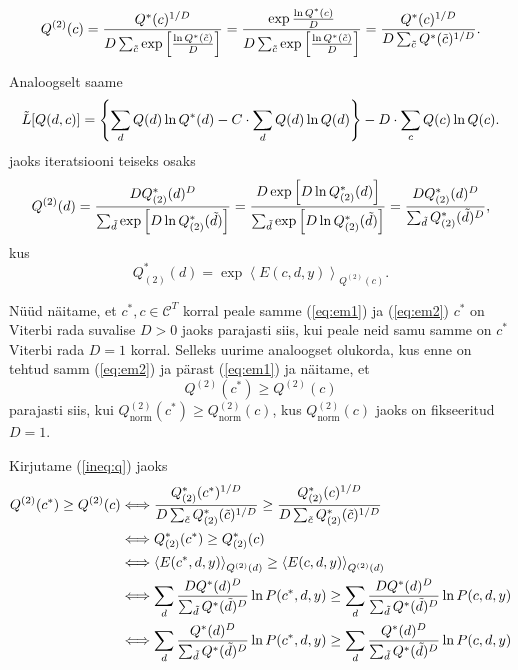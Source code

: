 \begin{equation}
    \label{eq:em1}
    Q^{(2)}(c) = \frac{Q^*(c)^{1/D}}{D \sum_{\Tilde{c}} \exp \left[\frac{\ln Q^*(\Tilde{c})}{D}\right]}= \frac{\exp \frac{\ln Q^*(c)}{D}}{D \sum_{\Tilde{c}} \exp \left[\frac{\ln Q^*(\Tilde{c})}{D}\right]} = \frac{Q^*(c)^{1/D}}{D \sum_{\Tilde{c}} Q^*(\Tilde{c})^{1/D}}.
\end{equation}

Analoogselt saame
$$
\Tilde{L}[Q(d, c)]= \left\{ \sum_{d} Q(d) \ln Q^*(d) - C \cdot \sum_{d} Q(d) \ln Q(d) \right\} -  D \cdot \sum_{c} Q(c) \ln Q(c) .
$$
jaoks iteratsiooni teiseks osaks
\begin{equation}
    \label{eq:em2}
    Q^{(2)}(d) = \frac{D Q^{*}_{(2)}(d)^{D}}{ \sum_{\Tilde{d}} \exp \left[D \ln Q^{*}_{(2)}(\Tilde{d})\right]}= \frac{D \exp \left[ D \ln Q^{*}_{(2)}(d) \right]}{ \sum_{\Tilde{d}} \exp \left[D \ln Q^{*}_{(2)}(\Tilde{d})\right]} = \frac{D Q^{*}_{(2)}(d)^D}{\sum_{\Tilde{d}} Q^{*}_{(2)}(\Tilde{d})^D},
\end{equation}
kus
$$Q^{*}_{(2)}(d) = \exp \left< E(c, d, y) \right>_{Q^{(2)}(c)}.$$

Nüüd näitame, et $c^*, c \in \mathcal{C}^T$ korral peale samme (\ref{eq:em1}) ja (\ref{eq:em2}) $c^*$ on Viterbi rada suvalise $D > 0$ jaoks parajasti siis, kui peale neid samu samme on $c^*$ Viterbi rada $D = 1$ korral. Selleks uurime analoogset olukorda, kus enne on tehtud samm (\ref{eq:em2}) ja pärast (\ref{eq:em1}) ja näitame, et 
\begin{equation}
    \label{ineq:q}
     Q^{(2)}(c^*) \ge Q^{(2)}(c)
\end{equation} parajasti siis, kui $Q^{(2)}_{\text{norm}}(c^*) \ge Q^{(2)}_{\text{norm}}(c)$, kus $Q^{(2)}_{\text{norm}}(c)$ jaoks on fikseeritud $D=1$.

Kirjutame (\ref{ineq:q}) jaoks
\begin{align*}
    Q^{(2)}(c^*) \ge Q^{(2)}(c) &\Longleftrightarrow \frac{Q^{*}_{(2)}(c^*)^{1/D}}{D \sum_{\Tilde{c}} Q^{*}_{(2)}(\Tilde{c})^{1/D}} \ge \frac{Q^{*}_{(2)}(c)^{1/D}}{D \sum_{\Tilde{c}} Q^{*}_{(2)}(\Tilde{c})^{1/D}} \\
     &\Longleftrightarrow Q^{*}_{(2)}(c^*) \ge Q^{*}_{(2)}(c) \\
     &\Longleftrightarrow \left<E(c^*,d,y) \right>_{Q^{(2)}(d)} \ge \left<E(c,d,y) \right>_{Q^{(2)}(d)} \\
     &\Longleftrightarrow \sum_{d} \frac{D Q^*(d)^D}{\sum_{\Tilde{d}} Q^*(\Tilde{d})^D} \ln P(c^*, d, y) \ge \sum_{d} \frac{D Q^*(d)^D}{\sum_{\Tilde{d}} Q^*(\Tilde{d})^D} \ln P(c, d, y) \\
     &\Longleftrightarrow \sum_{d} \frac{Q^*(d)^D}{\sum_{\Tilde{d}} Q^*(\Tilde{d})^D} \ln P(c^*, d, y) \ge \sum_{d} \frac{Q^*(d)^D}{\sum_{\Tilde{d}} Q^*(\Tilde{d})^D} \ln P(c, d, y) \\
\end{align*}

